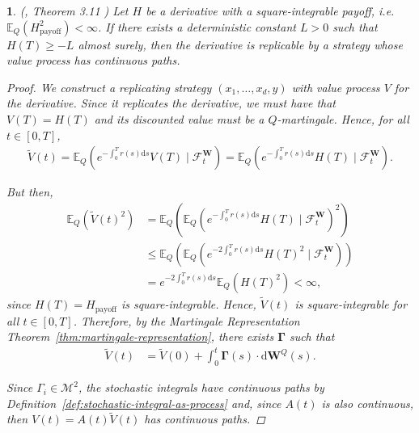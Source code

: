 \documentclass[english]{article}
\numberwithin{equation}{section}
\numberwithin{figure}{section}
\theoremstyle{bolddescit}
\newtheorem{theorem}{\protect\theoremname}[section]
\theoremstyle{definition}
\theoremstyle{definition}
\theoremstyle{plain}
\theoremstyle{plain}
\theoremstyle{bolddesc}
\theoremstyle{plain}
\theoremstyle{remark}
\providecommand{\theoremname}{Theorem}
\begin{document}
\begin{theorem}\label{thm:bs-replicability}
  (\cite{capinski_blackscholes_2012}, Theorem 3.11 )
  Let $H$ be a derivative with a square-integrable payoff, i.e. $\mathbb{E}_Q(H_\text{payoff}^2) < \infty$. If there exists a deterministic constant $L > 0$ such that $H(T) \ge -L$ almost surely, then the derivative is replicable by a strategy whose value process has continuous paths.

  \begin{proof}
    We construct a replicating strategy $(x_1,\ldots,x_d,y)$ with value process $V$ for the derivative. Since it replicates the derivative, we must have that $V(T) = H(T)$ and its discounted value must be a $Q$-martingale. Hence, for all $t \in [0,T]$,
    \begin{align*}
      \widetilde{V}(t)
      = \mathbb{E}_Q\left(e^{-\int_0^T r(s) \mathrm{d}s} V(T) \mid \mathcal{F}^\mathbf{W}_t\right)
      = \mathbb{E}_Q\left(e^{-\int_0^T r(s) \mathrm{d}s} H(T) \mid \mathcal{F}^\mathbf{W}_t\right).
    \end{align*}

    But then,
    \begin{align*}
      \mathbb{E}_Q(\widetilde{V}(t)^2)
      &= \mathbb{E}_Q\left(\mathbb{E}_Q\left(e^{-\int_0^T r(s) \mathrm{d}s} H(T) \mid \mathcal{F}^\mathbf{W}_t\right)^2\right)\\
      &\le \mathbb{E}_Q\left(\mathbb{E}_Q\left(e^{-2\int_0^T r(s) \mathrm{d}s} H(T)^2 \mid \mathcal{F}^\mathbf{W}_t\right)\right) \tag{Conditional Jensen's Inequality}\\
      &= e^{-2\int_0^T r(s) \mathrm{d}s} \mathbb{E}_Q\left(H(T)^2\right) < \infty,
    \end{align*}
    since $H(T) = H_\text{payoff}$ is square-integrable. Hence, $\widetilde{V}(t)$ is square-integrable for all $t \in [0,T]$. Therefore, by the Martingale Representation Theorem~\ref{thm:martingale-representation}, there exists $\mathbf{\Gamma}$ such that
    \begin{align}\label{eq:bs-repl-deriv-gamma}
      \widetilde{V}(t)
      &= \widetilde{V}(0) + \int_0^t \mathbf{\Gamma}(s) \cdot \mathrm{d}\mathbf{W}^Q(s).
    \end{align}

    Since $\Gamma_i \in \mathcal{M}^2$, the stochastic integrals have continuous paths by Definition~\ref{def:stochastic-integral-as-process} and, since $A(t)$ is also continuous, then $V(t) = A(t) \widetilde{V}(t)$ has continuous paths.


\end{proof}
\end{theorem}
\end{document}
